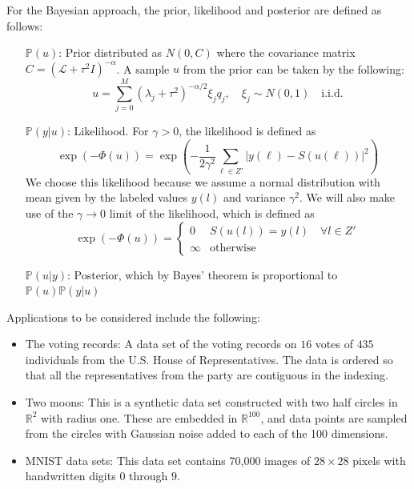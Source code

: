 \documentclass{siamart1116}
\begin{document}
For the Bayesian approach, the prior, likelihood and posterior are defined as follows:
\begin{itemize}
\item[$\mathbb{P}(u)$:] Prior distributed as $N(0,C)$ where the covariance matrix $C = (\mathcal{L} + \tau^2I)^{-\alpha}$. A sample $u$ from the prior can be taken by the following:
\begin{equation}
\label{eqn:prior}
u = \sum_{j=0}^M (\lambda_j + \tau^2)^{-\alpha/2}\xi_j q_j,\quad \xi_j\sim N(0,1) \quad \text{i.i.d.}
\end{equation}

\item[$\mathbb{P}(y|u)$:] Likelihood. For $\gamma > 0$, the likelihood is defined as
\begin{equation}
\label{eqn:likelihood}
\exp(-\Phi(u)) = \displaystyle\exp\left(-\frac{1}{2\gamma^2}\sum_{\ell\in Z'}|y(\ell)-S(u(\ell))|^2\right)
\end{equation}
We choose this likelihood because we assume a normal distribution with mean given by the labeled values $y(l)$ and variance $\gamma^2$.
We will also make use of the $\gamma\to 0$ limit of the likelihood, which is defined as
\begin{equation}
\label{eqn:gammatozero}
\exp(-\Phi(u)) = \begin{cases}
0 & S(u(l)) = y(l) \quad \forall l \in Z'\\
\infty & \text{otherwise}
\end{cases}
\end{equation}

\item[$\mathbb{P}(u|y)$:] Posterior, which by Bayes' theorem is proportional to $\mathbb{P}(u) \mathbb{P}(y | u)$
\end{itemize}

Applications to be considered include the following:
\begin{itemize}
\item The voting records: A data set of the voting records on $16$ votes of $435$ individuals from the U.S. House of Representatives. The data is ordered so that all the representatives from the party are contiguous in the indexing.
\item Two moons: This is a synthetic data set constructed with two half circles in $\mathbb{R}^2$ with radius one. These are embedded in $\mathbb{R}^{100}$, and data points are sampled from the circles with Gaussian noise added to each of the 100 dimensions.
\item MNIST data sets: This data set contains 70,000 images of $28 \times 28$ pixels with handwritten digits $0$ through $9$.
\end{itemize}
\end{document}
